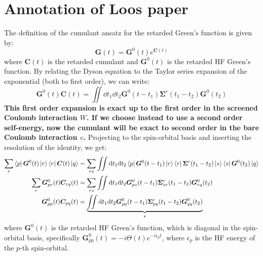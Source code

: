 \section{Annotation of Loos paper}
The definition of the cumulant ansatz for the retarded Green's function is given by:
\begin{equation}
    \bm{G}(t) = \bm{G}^0(t)e^{\bm{C}(t)}
\end{equation}
where $\bm{C}(t)$ is the retarded cumulant and $\bm{G}^0(t)$ is the retarded HF Green's function. By relating the Dyson equation to the Taylor series expansion of the exponential (both to first order), we can write:
\begin{equation}
    \bm{G}^0(t) \bm{C}(t) = \iint \dd t_1 \dd t_2 \bm{G}^0(t-t_1) \bm{\Sigma}^c(t_1 - t_2) \bm{G}^0(t_2)
\end{equation}
\textbf{This first order expansion is exact up to the first order in the screened Coulomb interaction $W$. If we choose instead to use a second order self-energy, now the cumulant will be exact to second order in the bare Coulomb interaction $v$.}
Projecting to the spin-orbital basis and inserting the resolution of the identity, we get:
\begin{align}
    \sum_{r}\bra{p}\bm{G}^0(t) \ket{r}\bra{r}\bm{C}(t)\ket{q} &= \sum_{rs}\iint \dd t_1 \dd t_2 \bra{p}\bm{G}^0(t-t_1)\ket{r} \bra{r}\bm{\Sigma}^c(t_1 - t_2)\ket{s} \bra{s}\bm{G}^0(t_2)\ket{q} \\
    \sum_{r}\bm{G}_{pr}^0(t) \bm{C}_{rq}(t) &= \sum_{rs}\iint \dd t_1 \dd t_2 \bm{G}_{ps}^0(t-t_1) \bm{\Sigma}_{sr}^c(t_1 - t_2) \bm{G}_{rq}^0(t_2)\\
    \bm{G}_{pp}^{0}(t) \bm{C}_{pq}(t) &= \underbrace{\iint \dd t_1 \dd t_2 \bm{G}_{pp}^{0}(t-t_1) \bm{\Sigma}_{pq}^c(t_1 - t_2) \bm{G}_{qq}^{0}(t_2)}_{*}
    \label{eqn:cumulant_connection}
\end{align}
where $\bm{G}^0(t)$ is the retarded HF Green's function, which is diagonal in the spin-orbital basis, specifically $\bm{G}_{pp}^{0}(t) = -i\Theta(t)e^{-i\epsilon_p t}$, where $\epsilon_p$ is the HF energy of the $p$-th spin-orbital.

